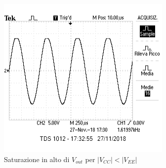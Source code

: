 \documentclass{article}
\begin{document}
\begin{figure}
	\centering
	\includegraphics[width=0.6\linewidth]{figure/5satAlto}
	\caption{Saturazione in alto di $V_{out}$ per $|V_{CC}|<|V_{EE}|$}
	\label{fig:5satalto}
\end{figure}
\end{document}
